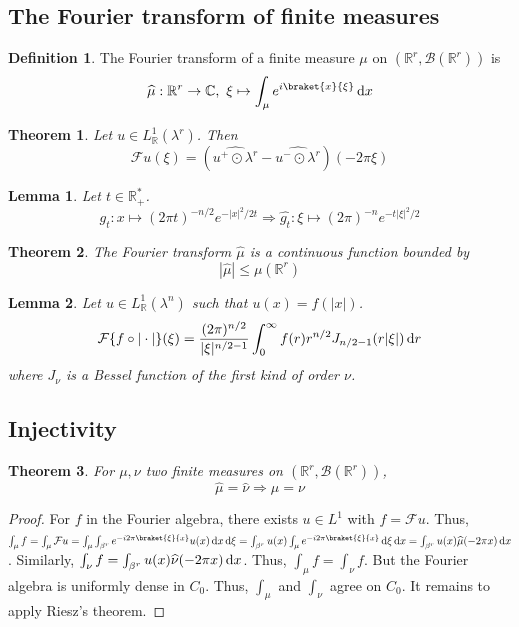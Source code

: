 \documentclass[11pt, a4paper, openany]{book}
\newtheorem{thm}{Theorem}\newtheorem{lem}{Lemma}\newtheorem{crl}{Corollary}
\theoremstyle{definition}
\newtheorem{define}{Definition}\newtheorem{exam}{Example}\newtheorem{remark}{Remark}
\begin{document}
\subsection{The Fourier transform of finite measures}
    \begin{define}
        The Fourier transform of a finite measure $\mu$ on $(\mathbb{R}^r,\mathscr{B}(\mathbb{R}^r))$ is
        \[
            \widehat{\mu}:\mathbb{R}^r\rightarrow \mathbb{C},\,\,\xi\mapsto \int_\mu e^{i\braket{x}{\xi}}\odif x
        \]
    \end{define}
    \begin{thm}
        Let $u\in L^1_{\mathbb{R}}(\lambda^r)$. Then 
        \[
        \mathcal{F}u(\xi)=(\widehat{u^+\odot \lambda^r}-\widehat{u^-\odot \lambda^r})(-2\pi\xi)
        \]
    \end{thm}
    \begin{lem}
        Let $t\in\mathbb{R}^*_+$.
        \[g_t:x\mapsto (2\pi t)^{-n/2}e^{-|x|^2/2t}\Longrightarrow \widehat{g_t}:\xi\mapsto (2\pi)^{-n}e^{-t|\xi|^2/2}\]
    \end{lem}
    \begin{thm}
        The Fourier transform $\widehat{\mu}$ is a continuous function bounded by
        \[
            |\widehat{\mu}|\leqslant \mu(\mathbb{R}^r)
        \]
    \end{thm}
    \begin{lem}
        Let $u\in L^1_{\mathbb{R}}(\lambda^n)$ such that $u(x)=f(|x|)$.
        \[\mathcal{F}\{f\circ |\cdot|\}(\xi)=\frac{(2\pi)^{n/2}}{|\xi|^{n/2-1}}\int_{0}^\infty f(r)r^{n/2}J_{n/2-1}(r|\xi|)\odif r\]
        where $J_\nu$ is a Bessel function of the first kind of order $\nu$.
    \end{lem}
\subsection{Injectivity}
    \begin{thm}
        For $\mu,\nu$ two finite measures on $(\mathbb{R}^r,\mathscr{B}(\mathbb{R}^r))$,
        \[
            \widehat{\mu}=\widehat{\nu}\Longrightarrow \mu=\nu
        \]
    \end{thm}
    \begin{proof}
        For $f$ in the Fourier algebra, there exists $u\in L^1$ with $f=\mathcal{F}u$. Thus, $\int_\mu f=\int_\mu \mathcal{F}u=\int_\mu\int_{\beta^r}e^{-i2\pi\braket{\xi}{x}}u(x)\odif x\odif\xi=\int_{\beta^r}u(x)\int_\mu e^{-i2\pi\braket{\xi}{x}}\odif\xi\odif x=\int_{\beta^r}u(x)\widehat{\mu}(-2\pi x)\odif x$. Similarly, $\int_\nu f=\int_{\beta^r}u(x)\widehat{\nu}(-2\pi x)\odif x$. Thus, $\int_\mu f=\int_\nu f$. But the Fourier algebra is uniformly dense in $C_0$. Thus, $\int_\mu$ and $\int_\nu$ agree on $C_0$. It remains to apply Riesz's theorem.
    \end{proof}
\end{document}
